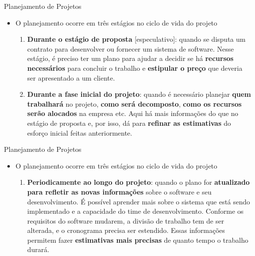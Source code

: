 \documentclass{beamer}
\begin{document}
\begin{frame}{Planejamento de Projetos}
	\begin{itemize}
		\justifying
		\item O planejamento ocorre em três estágios no ciclo de vida do projeto
		\begin{enumerate}
			\justifying
			\item<2> \textbf{Durante o estágio de proposta} [especulativo]: quando se disputa um contrato para desenvolver ou fornecer um sistema de software. Nesse estágio, é preciso ter um plano para ajudar a decidir se há \textbf{recursos necessários} para concluir o trabalho e \textbf{estipular o preço} que deveria ser apresentado a um cliente.
			\item<3> \textbf{Durante a fase inicial do projeto}: quando é necessário planejar \textbf{quem trabalhará} no projeto, \textbf{como será decomposto}, \textbf{como os recursos serão alocados} na empresa etc. Aqui há mais informações do que no estágio de proposta e, por isso, dá para \textbf{refinar as estimativas} do esforço inicial feitas anteriormente.
		\end{enumerate}
	\end{itemize}
\end{frame}

\begin{frame}{Planejamento de Projetos}
	\begin{itemize}
		\justifying
		\item O planejamento ocorre em três estágios no ciclo de vida do projeto
		\begin{enumerate}
			\justifying
			\setcounter{enumi}{2}
			\item \textbf{Periodicamente ao longo do projeto}: quando o plano for \textbf{atualizado para refletir as novas informações} sobre o software e seu desenvolvimento. É possível aprender mais sobre o sistema que está sendo implementado e a capacidade do time de desenvolvimento. Conforme os requisitos do software mudarem, a divisão de trabalho tem de ser alterada, e o cronograma precisa ser estendido. Essas informações permitem fazer \textbf{estimativas mais precisas} de quanto tempo o trabalho durará.
		\end{enumerate}
	\end{itemize}
\end{frame}
\end{document}
